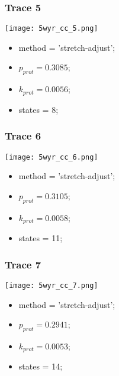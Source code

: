 \subsubsection{Trace 5}
\begin{minipage}[c]{0.7\textwidth}
    \texttt{[image: 5wyr\_cc\_5.png]}
\end{minipage}
\hfill
\begin{minipage}[c]{0.45\textwidth}
    \begin{itemize}
        \item method = 'stretch-adjust';
        \item $p_{prot}=0.3085$;
        \item $k_{prot}=0.0056$;
        \item states = 8;
    \end{itemize}
\end{minipage}

\subsubsection{Trace 6}
\begin{minipage}[c]{0.7\textwidth}
    \texttt{[image: 5wyr\_cc\_6.png]}
\end{minipage}
\hfill
\begin{minipage}[c]{0.45\textwidth}
    \begin{itemize}
        \item method = 'stretch-adjust';
        \item $p_{prot}=0.3105$;
        \item $k_{prot}=0.0058$;
        \item states = 11;
    \end{itemize}
\end{minipage}

\subsubsection{Trace 7}
\begin{minipage}[c]{0.7\textwidth}
    \texttt{[image: 5wyr\_cc\_7.png]}
\end{minipage}
\hfill
\begin{minipage}[c]{0.45\textwidth}
    \begin{itemize}
        \item method = 'stretch-adjust';
        \item $p_{prot}=0.2941$;
        \item $k_{prot}=0.0053$;
        \item states = 14;
    \end{itemize}
\end{minipage}

